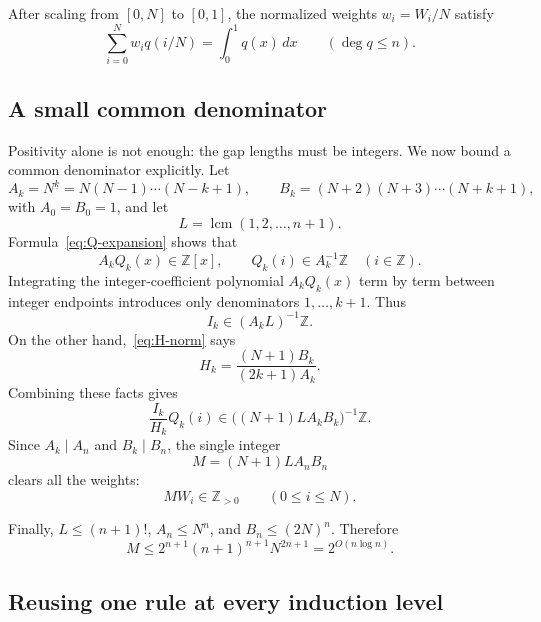 \documentclass[11pt]{article}
\theoremstyle{definition}
\theoremstyle{remark}
\newcommand{\fall}[2]{#1^{\underline{#2}}}
\DeclareMathOperator{\lcm}{lcm}
\begin{document}
After scaling from \([0,N]\) to \([0,1]\), the normalized weights
\(w_i=W_i/N\) satisfy
\begin{equation}\label{eq:quadrature-unit}
  \sum_{i=0}^Nw_iq(i/N)=\int_0^1q(x)\,dx
  \qquad(\deg q\leq n).
\end{equation}

\subsection{A small common denominator}

Positivity alone is not enough: the gap lengths must be integers.  We now
bound a common denominator explicitly.  Let
\[
  A_k=\fall{N}{k}=N(N-1)\cdots(N-k+1),
  \qquad
  B_k=(N+2)(N+3)\cdots(N+k+1),
\]
with \(A_0=B_0=1\), and let
\[
  L=\lcm(1,2,\ldots,n+1).
\]
Formula~\eqref{eq:Q-expansion} shows that
\begin{equation}\label{eq:Q-denom}
  A_kQ_k(x)\in\mathbb Z[x],
  \qquad Q_k(i)\in A_k^{-1}\mathbb Z\quad(i\in\mathbb Z).
\end{equation}
Integrating the integer-coefficient polynomial \(A_kQ_k(x)\) term by term
between integer endpoints introduces only denominators \(1,\ldots,k+1\).
Thus
\begin{equation}\label{eq:I-denom}
  I_k\in(A_kL)^{-1}\mathbb Z.
\end{equation}
On the other hand,~\eqref{eq:H-norm} says
\[
  H_k=\frac{(N+1)B_k}{(2k+1)A_k}.
\]
Combining these facts gives
\begin{equation}\label{eq:term-denom}
  \frac{I_k}{H_k}Q_k(i)
  \in\bigl((N+1)LA_kB_k\bigr)^{-1}\mathbb Z.
\end{equation}
Since \(A_k\mid A_n\) and \(B_k\mid B_n\), the single integer
\begin{equation}\label{eq:M-def}
  M=(N+1)LA_nB_n
\end{equation}
clears all the weights:
\begin{equation}\label{eq:MW-integer}
  MW_i\in\mathbb Z_{>0}\qquad(0\leq i\leq N).
\end{equation}

Finally, \(L\leq(n+1)!\), \(A_n\leq N^n\), and
\(B_n\leq(2N)^n\).  Therefore
\begin{equation}\label{eq:M-bound}
  M\leq2^{n+1}(n+1)^{n+1}N^{2n+1}=2^{O(n\log n)}.
\end{equation}

\subsection{Reusing one rule at every induction level}
\end{document}
